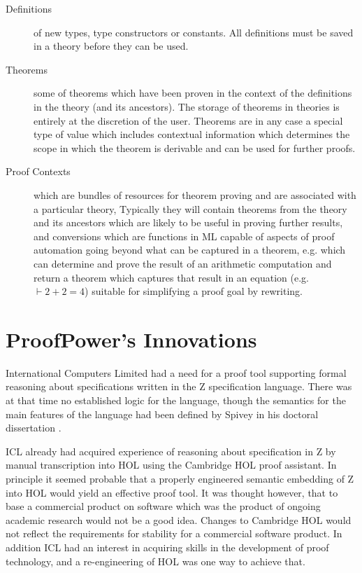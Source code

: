 \documentclass{rbjk}
\begin{document}
\begin{article}
\begin{description}
\item[Definitions]
of new types, type constructors or constants.
All definitions must be saved in a theory before they can be used.
\item[Theorems]
some of theorems which have been proven in the context of the definitions in
the theory (and its ancestors).
The storage of theorems in theories is entirely at the discretion of
the user.
Theorems are in any case a special type of value which includes
contextual information which determines the scope in which the theorem
is derivable and can be used for further proofs.
\item[Proof Contexts]
which are bundles of resources for theorem proving and are associated
with a particular theory,
Typically they will contain theorems from the theory and its
ancestors which are likely to be useful in proving further results,
and conversions which are functions in ML capable of aspects of proof
automation going beyond what can be captured in a theorem, e.g. which
can determine and prove the result of an arithmetic computation and
return a theorem which captures that result in an equation
(e.g. $\vdash 2+2=4$) suitable for simplifying a proof goal by
rewriting. 
\end{description}

\section{ProofPower's Innovations}

International Computers Limited had a need for a proof tool supporting
formal reasoning about specifications written in the Z specification
language.
There was at that time no established logic for the language, though
the semantics for the main features of the language had been defined
by Spivey in his doctoral dissertation \cite{spivey88}.

ICL already had acquired experience of reasoning about specification
in Z by manual transcription into HOL using the Cambridge HOL proof
assistant.
In principle it seemed probable that a properly engineered semantic
embedding of Z into HOL would yield an effective proof tool.
It was thought however, that to base a commercial product on software
which was the product of ongoing academic research would not be a good
idea.
Changes to Cambridge HOL would not reflect the requirements for
stability for a commercial software product.
In addition ICL had an interest in acquiring skills in the development
of proof technology, and a re-engineering of HOL was one way to
achieve that.


\end{article}
\end{document}
